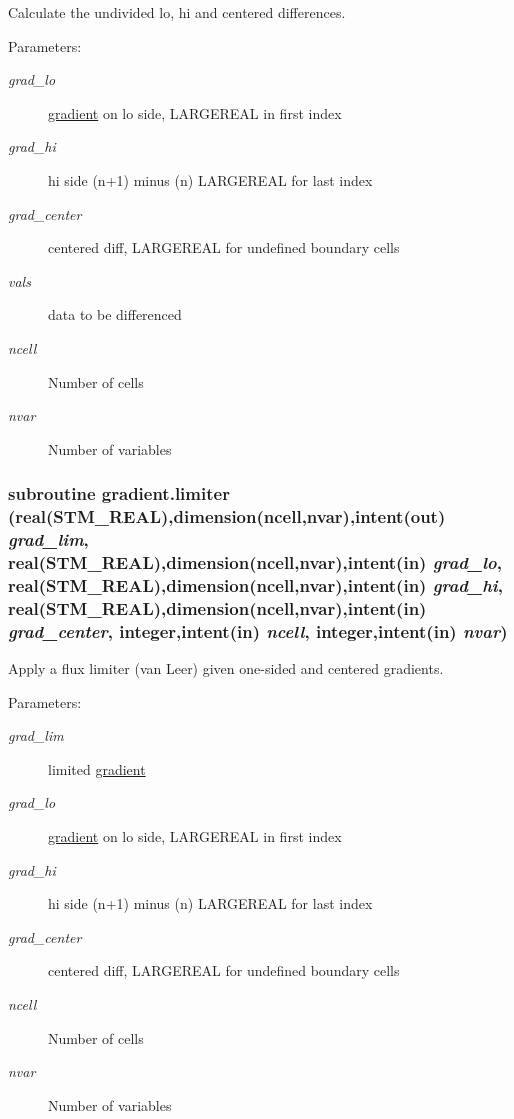 Calculate the undivided lo, hi and centered differences. 

\begin{Desc}
\item[Parameters:]
\begin{description}
\item[{\em grad\_\-lo}]\hyperlink{a00033}{gradient} on lo side, LARGEREAL in first index\item[{\em grad\_\-hi}]hi side (n+1) minus (n) LARGEREAL for last index\item[{\em grad\_\-center}]centered diff, LARGEREAL for undefined boundary cells\item[{\em vals}]data to be differenced\item[{\em ncell}]Number of cells\item[{\em nvar}]Number of variables \end{description}
\end{Desc}
\hypertarget{a00033_64ad308bd281dd6315a927bf0f9721da}{
\subsubsection[{limiter}]{\setlength{\rightskip}{0pt plus 5cm}subroutine gradient.limiter (real(STM\_\-REAL),dimension(ncell,nvar),intent(out) {\em grad\_\-lim}, \/  real(STM\_\-REAL),dimension(ncell,nvar),intent(in) {\em grad\_\-lo}, \/  real(STM\_\-REAL),dimension(ncell,nvar),intent(in) {\em grad\_\-hi}, \/  real(STM\_\-REAL),dimension(ncell,nvar),intent(in) {\em grad\_\-center}, \/  integer,intent(in) {\em ncell}, \/  integer,intent(in) {\em nvar})}}
\label{a00033_64ad308bd281dd6315a927bf0f9721da}


Apply a flux limiter (van Leer) given one-sided and centered gradients. 

\begin{Desc}
\item[Parameters:]
\begin{description}
\item[{\em grad\_\-lim}]limited \hyperlink{a00033}{gradient}\item[{\em grad\_\-lo}]\hyperlink{a00033}{gradient} on lo side, LARGEREAL in first index\item[{\em grad\_\-hi}]hi side (n+1) minus (n) LARGEREAL for last index\item[{\em grad\_\-center}]centered diff, LARGEREAL for undefined boundary cells \item[{\em ncell}]Number of cells\item[{\em nvar}]Number of variables \end{description}
\end{Desc}
